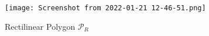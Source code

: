 \begin{figure}[h!]
    \centering
    \texttt{[image: Screenshot from 2022-01-21 12-46-51.png]}
    \caption{Rectilinear Polygon $\mathcal P_R$}
    \label{fig:rectilinear}
\end{figure}
